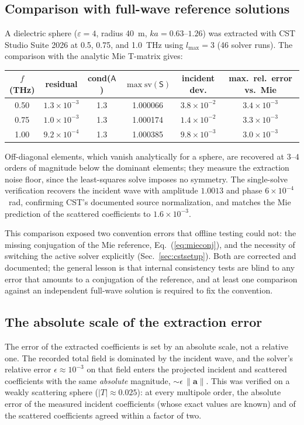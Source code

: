 \documentclass[11pt]{article}
\begin{document}
\subsection{Comparison with full-wave reference solutions}
A dielectric sphere ($\varepsilon = 4$, radius 40~\textmu m,
$ka = 0.63$--$1.26$) was extracted with CST Studio Suite 2026 at 0.5,
0.75, and 1.0~THz using $l_{\max}=3$ (46 solver runs).  The comparison
with the analytic Mie T-matrix gives:
\begin{center}
\begin{tabular}{cccccc}
\toprule
$f$ (THz) & residual & cond($\mathsf{A}$) & $\max\mathrm{sv}(\mathsf{S})$
 & incident dev. & max.\ rel.\ error vs.\ Mie\\
\midrule
0.50 & $1.3\times10^{-3}$ & 1.3 & 1.000066 & $3.8\times10^{-2}$ &
 $3.4\times10^{-3}$\\
0.75 & $1.0\times10^{-3}$ & 1.3 & 1.000174 & $1.4\times10^{-2}$ &
 $3.3\times10^{-3}$\\
1.00 & $9.2\times10^{-4}$ & 1.3 & 1.000385 & $9.8\times10^{-3}$ &
 $3.0\times10^{-3}$\\
\bottomrule
\end{tabular}
\end{center}
Off-diagonal elements, which vanish analytically for a sphere, are
recovered at $3$--$4$ orders of magnitude below the dominant elements;
they measure the extraction noise floor, since the least-squares solve
imposes no symmetry.  The single-solve verification recovers the incident
wave with amplitude $1.0013$ and phase $6\times10^{-4}$~rad, confirming
CST's documented source normalization, and matches the Mie prediction of
the scattered coefficients to $1.6\times10^{-3}$.

This comparison exposed two convention errors that offline testing could
not: the missing conjugation of the Mie reference,
Eq.~(\ref{eq:mieconj}), and the necessity of switching the active solver
explicitly (Sec.~\ref{sec:cstsetup}).  Both are corrected and documented;
the general lesson is that internal consistency tests are blind to any
error that amounts to a conjugation of the reference, and at least one
comparison against an independent full-wave solution is required to fix
the convention.

\subsection{The absolute scale of the extraction error}
\label{sec:noisefloor}
The error of the extracted coefficients is set by an absolute scale,
not a relative one.  The recorded total field is dominated by the
incident wave, and the solver's relative error $\epsilon \approx
10^{-3}$ on that field enters the projected incident and scattered
coefficients with the same \emph{absolute} magnitude,
$\sim\epsilon\,\|\mathbf{a}\|$.  This was verified on a weakly
scattering sphere ($|T| \approx 0.025$): at every multipole order, the
absolute error of the measured incident coefficients (whose exact
values are known) and of the scattered coefficients agreed within a
factor of two.
\end{document}
